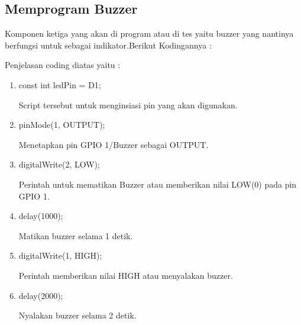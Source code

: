 \subsection{Memprogram Buzzer}
\par Komponen ketiga yang akan di program atau di tes yaitu buzzer yang nantinya  berfungsi untuk sebagai indikator.Berikut Kodingannya :

\par Penjelasan coding diatas yaitu :
\begin{enumerate}
    \item const int ledPin = D1;
    \par Script tersebut untuk menginsiasi pin yang akan digunakan.
    \item pinMode(1, OUTPUT); 
    \par Menetapkan pin GPIO 1/Buzzer sebagai OUTPUT.
    \item digitalWrite(2, LOW);
    \par  Perintah untuk mematikan Buzzer atau memberikan nilai LOW(0) pada pin GPIO 1.
    \item delay(1000); 
    \par Matikan buzzer selama 1 detik.
    \item digitalWrite(1, HIGH);
    \par Perintah memberikan nilai HIGH atau menyalakan buzzer.
    \item delay(2000);
    \par Nyalakan buzzer selama 2 detik.
\end{enumerate}


